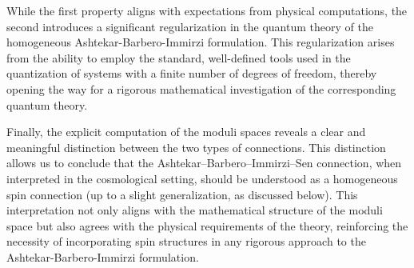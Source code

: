 \documentclass{article}
\numberwithin{equation}{section}
\theoremstyle{definition}
\begin{document}
While the first property aligns with expectations from physical computations, the second introduces a significant regularization in the quantum theory of the homogeneous Ashtekar-Barbero-Immirzi formulation. This regularization arises from the ability to employ the standard, well-defined tools used in the quantization of systems with a finite number of degrees of freedom, thereby opening the way for a rigorous mathematical investigation of the corresponding quantum theory.

\medskip

Finally, the explicit computation of the moduli spaces reveals a clear and meaningful distinction between the two types of connections. This distinction allows us to conclude that the Ashtekar–Barbero–Immirzi–Sen connection, when interpreted in the cosmological setting, should be understood as a homogeneous spin connection (up to a slight generalization, as discussed below). This interpretation not only aligns with the mathematical structure of the moduli space but also agrees with the physical requirements of the theory, reinforcing the necessity of incorporating spin structures in any rigorous approach to the Ashtekar-Barbero-Immirzi formulation.
\end{document}
